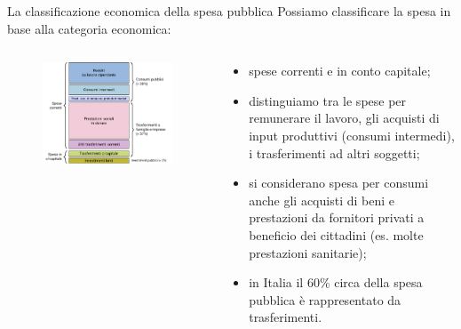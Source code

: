 \documentclass[aspectratio=149,11pt,italian]{beamer}
\begin{document}
\begin{frame}{La classificazione economica della spesa pubblica}
Possiamo classificare la spesa in base alla categoria economica:
\begin{columns}
\begin{column}{.55\columnwidth}
\begin{figure}
\centering
\includegraphics[width=1.1\textwidth]{./figure/spesa-pubblica-classificazione-economica-color.pdf}
\end{figure}
\end{column}

\begin{column}{.45\columnwidth}
\footnotesize
\begin{itemize}
\item spese correnti e in conto capitale;
\item distinguiamo tra le spese per remunerare il lavoro, gli acquisti di input produttivi (consumi intermedi), i trasferimenti ad altri soggetti;
\item si considerano spesa per consumi anche gli acquisti di beni e prestazioni da fornitori privati a beneficio dei cittadini (es. molte prestazioni sanitarie);
\item in Italia il 60\% circa della spesa pubblica è rappresentato da trasferimenti.
\end{itemize}
\end{column}
\end{columns}
\end{frame}
\end{document}
